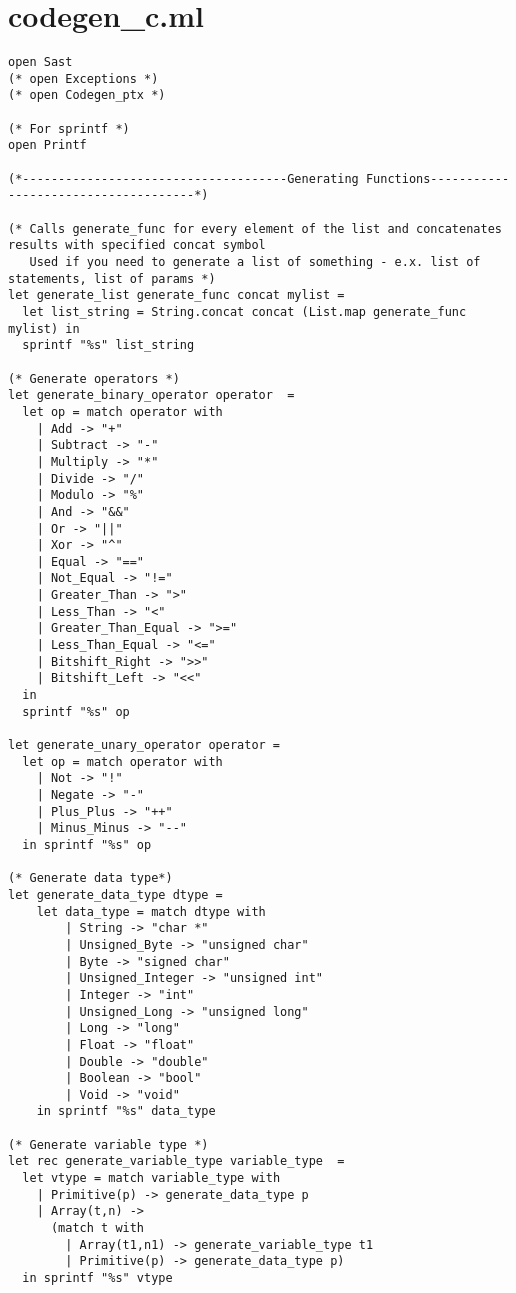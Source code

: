 \section{codegen_c.ml}
\begin{verbatim}
open Sast
(* open Exceptions *)
(* open Codegen_ptx *) 

(* For sprintf *)
open Printf

(*-------------------------------------Generating Functions-------------------------------------*)

(* Calls generate_func for every element of the list and concatenates results with specified concat symbol
   Used if you need to generate a list of something - e.x. list of statements, list of params *)
let generate_list generate_func concat mylist = 
  let list_string = String.concat concat (List.map generate_func mylist) in
  sprintf "%s" list_string

(* Generate operators *)
let generate_binary_operator operator  =
  let op = match operator with
    | Add -> "+"
    | Subtract -> "-"
    | Multiply -> "*"
    | Divide -> "/"
    | Modulo -> "%"
    | And -> "&&"
    | Or -> "||"
    | Xor -> "^"
    | Equal -> "=="
    | Not_Equal -> "!="
    | Greater_Than -> ">"
    | Less_Than -> "<"
    | Greater_Than_Equal -> ">=" 
    | Less_Than_Equal -> "<="
    | Bitshift_Right -> ">>"
    | Bitshift_Left -> "<<"
  in
  sprintf "%s" op

let generate_unary_operator operator = 
  let op = match operator with 
    | Not -> "!"
    | Negate -> "-"
    | Plus_Plus -> "++"
    | Minus_Minus -> "--"
  in sprintf "%s" op

(* Generate data type*)
let generate_data_type dtype = 
    let data_type = match dtype with 
        | String -> "char *"
        | Unsigned_Byte -> "unsigned char"
        | Byte -> "signed char"
        | Unsigned_Integer -> "unsigned int"
        | Integer -> "int"
        | Unsigned_Long -> "unsigned long"
        | Long -> "long"
        | Float -> "float"
        | Double -> "double"
        | Boolean -> "bool"
        | Void -> "void"
    in sprintf "%s" data_type

(* Generate variable type *)
let rec generate_variable_type variable_type  =
  let vtype = match variable_type with
    | Primitive(p) -> generate_data_type p
    | Array(t,n) -> 
      (match t with
        | Array(t1,n1) -> generate_variable_type t1 
        | Primitive(p) -> generate_data_type p)
  in sprintf "%s" vtype


\end{verbatim}
